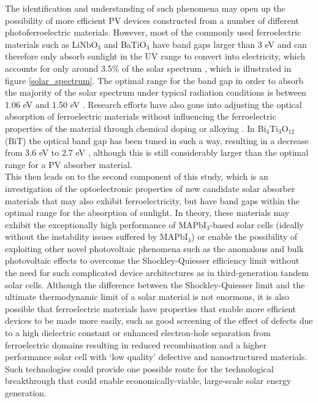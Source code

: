 The identification and understanding of such phenomena may open up the possibility of more efficient PV devices constructed from a number of different photoferroelectric materials. However, most of the commonly used ferroelectric materials such as LiNbO$_3$ and BaTiO$_3$ have band gaps larger than 3 eV and can therefore only absorb sunlight in the UV range to convert into electricity, which accounts for only around 3.5\% of the solar spectrum \cite{FE_PV_rev1}, which is illustrated in figure \ref{solar_spectrum}. The optimal range for the band gap in order to absorb the majority of the solar spectrum under typical radiation conditions is between 1.06 eV and 1.50 eV \cite{CZTS_book}. Research efforts have also gone into adjusting the optical absorption of ferroelectric materials without influencing the ferroelectric properties of the material through chemical doping or alloying \cite{FE_PV_rev1}. In Bi$_4$Ti$_3$O$_{12}$ (BiT) the optical band gap has been tuned in such a way, resulting in a decrease from 3.6 eV to 2.7 eV \cite{FE_PV_rev1_83}, although this is still considerably larger than the optimal range for a PV absorber material.\\

This then leads on to the second component of this study, which is an investigation of the optoelectronic properties of new candidate solar absorber materials that may also exhibit ferroelectricity, but have band gaps within the optimal range for the absorption of sunlight. In theory, these materials may exhibit the exceptionally high performance of MAPbI$_3$-based solar cells (ideally without the instability issues suffered by MAPbI$_3$) or enable the possibility of exploiting other novel photovoltaic phenomena such as the anomalous and bulk photovoltaic effects to overcome the Shockley-Quiesser efficiency limit without the need for such complicated device architectures as in third-generation tandem solar cells. Although the difference between the Shockley-Quiesser limit and the ultimate thermodynamic limit of a solar material is not enormous, it is also possible that ferroelectric materials have properties that enable more efficient devices to be made more easily, such as good screening of the effect of defects due to a high dielectric constant or enhanced electron-hole separation from ferroelectric domains resulting in reduced recombination and a higher performance solar cell with `low quality' defective and nanostructured materials. Such technologies could provide one possible route for the technological breakthrough that could enable economically-viable, large-scale solar energy generation.

